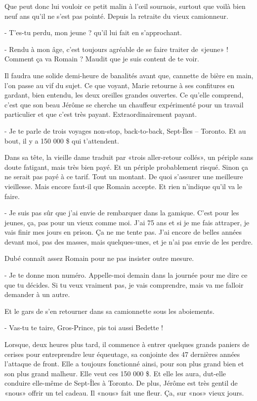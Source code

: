 Que peut donc lui vouloir ce petit malin à l’œil sournois, surtout que voilà bien neuf ans qu’il ne s’est pas pointé. Depuis la retraite du vieux camionneur.

- T’es-tu perdu, mon jeune ? qu’il lui fait en s’approchant.

- Rendu à mon âge, c’est toujours agréable de se faire traiter de «jeune» ! Comment ça va Romain ? Maudit que je suis content de te voir.

Il faudra une solide demi-heure de banalités avant que, cannette de bière en main, l’on passe au vif du sujet. Ce que voyant, Marie retourne à ses confitures en gardant, bien entendu, les deux oreilles grandes ouvertes. Ce qu’elle comprend, c’est que son beau Jérôme se cherche un chauffeur expérimenté pour un travail particulier et que c’est très payant. Extraordinairement payant.

- Je te parle de trois voyages non-stop, back-to-back, Sept-Îles – Toronto. Et au bout, il y a 150 000 \$ qui t’attendent.

Dans sa tête, la vieille dame traduit par «trois aller-retour collés», un périple sans doute fatigant, mais très bien payé. Et un périple probablement risqué. Sinon ça ne serait pas payé à ce tarif. Tout un montant. De quoi s’assurer une meilleure vieillesse. Mais encore faut-il que Romain accepte. Et rien n’indique qu’il va le faire.

- Je suis pas sûr que j’ai envie de rembarquer dans la gamique. C’est pour les jeunes, ça, pas pour un vieux comme moi. J’ai 75 ans et si je me fais attraper, je vais finir mes jours en prison. Ça ne me tente pas. J’ai encore de belles années devant moi, pas des masses, mais quelques-unes, et je n’ai pas envie de les perdre.

Dubé connaît assez Romain pour ne pas insister outre mesure.

- Je te donne mon numéro. Appelle-moi demain dans la journée pour me dire ce que tu décides. Si tu veux vraiment pas, je vais comprendre, mais va me falloir demander à un autre.

Et le gars de s’en retourner dans sa camionnette sous les aboiements.

- Vas-tu te taire, Gros-Prince, pis toi aussi Bedette !

Lorsque, deux heures plus tard, il commence à entrer quelques grands paniers de cerises pour entreprendre leur équeutage, sa conjointe des 47 dernières années l’attaque de front. Elle a toujours fonctionné ainsi, pour son plus grand bien et son plus grand malheur. Elle veut ces 150 000 \$. Et elle les aura, dut-elle conduire elle-même de Sept-Îles à Toronto. De plus, Jérôme est très gentil de «nous» offrir un tel cadeau. Il «nous» fait une fleur. Ça, sur «nos» vieux jours.

